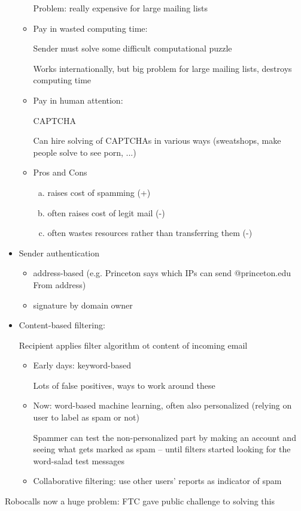 \begin{itemize}
\begin{itemize}
                Problem: really expensive for large mailing lists
            \item Pay in wasted computing time:

                Sender must solve some difficult computational puzzle

                Works internationally, but big problem for large mailing lists,
                destroys computing time
            \item Pay in human attention:

                CAPTCHA %

                Can hire solving of CAPTCHAs in various ways (sweatshops, make
                    people solve to see porn, ...)
                 
             \item Pros and Cons
                		 \begin{enumerate}[(a)]
  			 \item raises cost of spamming (+)
  			 \item often raises cost of legit mail (-)
  			 \item often wastes resources rather than transferring them (-)
			\end{enumerate}
        \end{itemize}
    \item Sender authentication
    	\begin{itemize}
			\item address-based (e.g. Princeton says which IPs can send @princeton.edu From address)
			\item signature by domain owner
	\end{itemize}
    \item Content-based filtering:

        Recipient applies filter algorithm ot content of incoming email
        \begin{itemize}
            \item Early days: keyword-based

                Lots of false positives, ways to work around these
            \item Now: word-based machine learning, often also personalized
                (relying on user to label as spam or not)

                Spammer can test the non-personalized part by making an account
                and seeing what gets marked as spam -- until filters started
                looking for the word-salad test messages
            \item Collaborative filtering: use other users' reports as indicator
                of spam
        \end{itemize}
\end{itemize}

Robocalls now a huge problem: FTC gave public challenge to solving this
